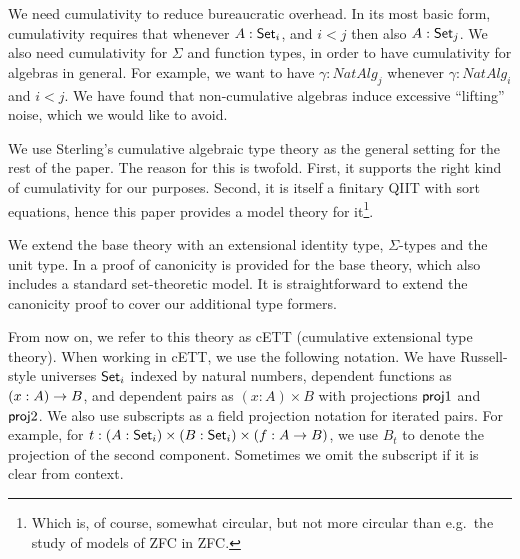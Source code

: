 \documentclass{llncs}
\begin{document}

We need cumulativity to reduce bureaucratic overhead. In its most basic form,
cumulativity requires that whenever $A : \mathsf{Set}_i$, and $i < j$ then also $A :
\mathsf{Set}_j$. We also need cumulativity for $\Sigma$ and function types, in order to
have cumulativity for algebras in general. For example, we want to have $\gamma
: NatAlg_j$ whenever $\gamma : NatAlg_i$ and $i < j$. We have found that
non-cumulative algebras induce excessive ``lifting'' noise, which we would like
to avoid.


We use Sterling's cumulative algebraic type theory \cite{TODO} as the general
setting for the rest of the paper. The reason for this is twofold. First, it
supports the right kind of cumulativity for our purposes. Second, it is itself a
finitary QIIT with sort equations, hence this paper provides a model theory for
it\footnote{Which is, of course, somewhat circular, but not more circular than
  e.g.\ the study of models of ZFC in ZFC.}.

We extend the base theory with an extensional identity type, $\Sigma$-types and
the unit type. In \cite{TODO} a proof of canonicity is provided for the base
theory, which also includes a standard set-theoretic model. It is
straightforward to extend the canonicity proof to cover our additional type
formers.

From now on, we refer to this theory as cETT (cumulative extensional type
theory). When working in cETT, we use the following notation. We have
Russell-style universes $\mathsf{Set}_i$ indexed by natural numbers, dependent functions
as $(x : A)\rightarrow B$, and dependent pairs as $(x : A)\times B$ with projections
$\mathsf{proj}1$ and $\mathsf{proj}2$. We also use subscripts as a field projection notation for
iterated pairs. For example, for $t : (A : \mathsf{Set}_i) \times (B : \mathsf{Set}_i) \times (f
: A \rightarrow B)$, we use $B_t$ to denote the projection of the second
component. Sometimes we omit the subscript if it is clear from context.
\end{document}
